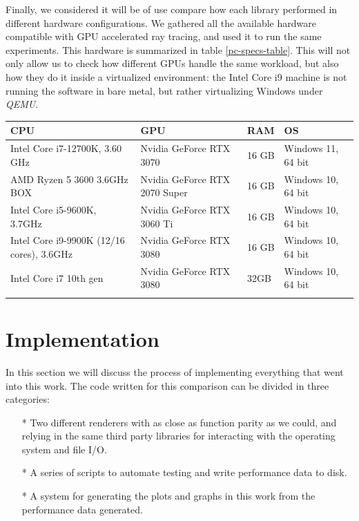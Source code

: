 Finally, we considered it will be of use compare how each library performed in different hardware configurations. We gathered all the available hardware compatible with GPU accelerated ray tracing, and used it to run the same experiments. This hardware is summarized in table \ref{pc-specs-table}. This will not only allow us to check how different GPUs handle the same workload, but also how they do it inside a virtualized environment: the Intel Core i9 machine is not running the software in bare metal, but rather virtualizing Windows under \textit{QEMU}.

\begin{center}
  \begin{tabular}{ | m{5cm} | m{3.5cm}| m{2cm}|m{4cm} |}
  \hline
  CPU& GPU& RAM& OS\\
  \hline
    Intel Core i7-12700K, 3.60 GHz& Nvidia GeForce RTX 3070& 16 GB& Windows 11, 64 bit\\ %
  \hline
    AMD Ryzen 5 3600 3.6GHz BOX& Nvidia GeForce RTX 2070 Super& 16 GB& Windows 10, 64 bit\\ %
  \hline
    Intel Core i5-9600K, 3.7GHz& Nvidia GeForce RTX 3060 Ti& 16 GB& Windows 10, 64 bit\\ %
  \hline
    Intel Core i9-9900K (12/16 cores), 3.6GHz& Nvidia GeForce RTX 3080& 16 GB& Windows 10, 64 bit\\ %
  \hline
    Intel Core i7 10th gen& Nvidia GeForce RTX 3080& 32GB& Windows 10, 64 bit\\ %
  \label{pc-specs-table}
\end{tabular}
\end{center}

\clearpage


\section{Implementation}
In this section we will discuss the process of implementing everything that went into this work. The code written for this comparison can be divided in three categories:

\begin{itemize}
    \item[*]{Two different renderers with as close as function parity as we could, and relying in the same third party libraries for interacting with the operating system and file I/O.}
    \item[*]{A series of scripts to automate testing and write performance data to disk.}
    \item[*]{A system for generating the plots and graphs in this work from the performance data generated.}
\end{itemize}

